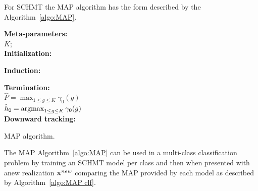 \documentclass[a4paper,11pt]{report}
\begin{document}
    For SCHMT the MAP algorithm has the form described by the Algorithm~\ref{algo:MAP}.
    
		\begin{center}
			\begin{algorithm}
				\textbf{Meta-parameters:}\\
					$K$;\\
					
				\textbf{Initialization:}\\
					
				\textbf{Induction:}\\
				
				\textbf{Termination:}\\
					$\hat{P} = \max_{1\leq g \leq K} \gamma_{0}(g)$\\
					$\hat{h}_{0} = \mathop{\rm argmax}_{1\leq g \leq K} \gamma_{0}(g)$\\
				
				\textbf{Downward tracking:}\\
				
				\caption{MAP algorithm.}
				\label{algo:MAP}
			\end{algorithm}        
		\end{center}
		
		The MAP Algorithm~\ref{algo:MAP} can be used in a multi-class classification problem by training an SCHMT model per class and then when presented with anew realization ${\bf x}^{new}$ comparing the MAP provided by each model as described by Algorithm~\ref{algo:MAP clf}.
		
\end{document}
